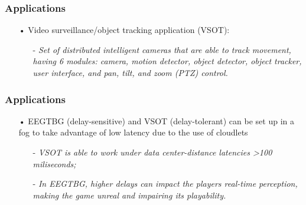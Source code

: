 \documentclass[10pt, pdf, xcolor=pdftex, dvipsnames, table]{beamer}
\begin{document}
\begin{frame}
	\frametitle{Applications}
 	\begin{block}{}
 		\begin{itemize}
 		    \item[•] Video surveillance/object tracking application (VSOT):\newline
 				\begin{itemize}
 		    		\item[-] \footnotesize\textit{Set of distributed intelligent cameras that are able to track movement, having 6 modules: camera, motion detector, object detector, object tracker, user interface, and pan, tilt, and zoom (PTZ) control.}\newline
 		    	\end{itemize}
 		\end{itemize}
 	\end{block}
\end{frame}

\begin{frame}
	\frametitle{Applications}
 	\begin{block}{}
 		\begin{itemize}
 		    \item[•] EEGTBG (delay-sensitive) and VSOT (delay-tolerant) can be set up in a fog to take advantage of low latency due to the use of cloudlets\newline
 				\begin{itemize}
 		    		\item[-] \footnotesize\textit{VSOT is able to work under data center-distance latencies >100 miliseconds;}\newline
 		    		\item[-] \footnotesize\textit{In EEGTBG, higher delays can impact the players real-time perception, making the game unreal and impairing its playability.}
 		    	\end{itemize}
 		\end{itemize}
 	\end{block}
\end{frame}
\end{document}

